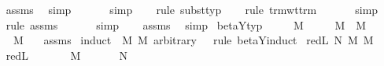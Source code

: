 \begin{isabellebody}
\ \ \isamarkupfalse%
\ assms\ \isamarkupfalse%
\ simp\isanewline
\ \ \isamarkupfalse%
\ {}\ \isamarkupfalse%
\ simp\isanewline
\ \ \isamarkupfalse%
\ {\isacharparenleft}rule\ subst{\isacharunderscore}typ{\isacharparenright}\isanewline
\ \ \isamarkupfalse%
\ {\isacharparenleft}rule\ trm{\isacharunderscore}wt{\isacharunderscore}trm{\isacharparenright}\isanewline
\ \ \isamarkupfalse%
\ {}\ \isamarkupfalse%
\ simp\isanewline
\ \ \isamarkupfalse%
\ {\isacharparenleft}rule\ assms{\isacharparenleft}{}{\isacharparenright}{\isacharparenright}\isanewline
\ \ \isamarkupfalse%
\ {}\ \isamarkupfalse%
\ simp\isanewline
\ \ \isamarkupfalse%
\ assms\ \isamarkupfalse%
\ simp\isanewline
{}\isamarkupfalse%
%
\endisatagproof
{\isafoldproof}%
%
\isadelimproof
\isanewline
%
\endisadelimproof
\isanewline
{}\isamarkupfalse%
\ beta{\isacharunderscore}Y{\isacharunderscore}typ{\isacharcolon}\isanewline
\ \ \ {\isachardoublequoteopen}{\isasymGamma}\ {\isasymturnstile}\ M\ {\isacharcolon}\ {\isasymsigma}{\isachardoublequoteclose}\isanewline
\ \ \ {\isachardoublequoteopen}M\ {\isasymRightarrow}\ M{\isacharprime}{\isachardoublequoteclose}\isanewline
\ \ \ {\isachardoublequoteopen}{\isasymGamma}\ {\isasymturnstile}\ M{\isacharprime}\ {\isacharcolon}\ {\isasymsigma}{\isachardoublequoteclose}\isanewline
%
\isadelimproof
%
\endisadelimproof
%
\isatagproof
{}\isamarkupfalse%
\ assms{\isacharparenleft}{}{\isacharcomma}{}{\isacharparenright}\isanewline
{}\isamarkupfalse%
\ {\isacharparenleft}induct\ \ M\ M{\isacharprime}\ arbitrary{\isacharcolon}\ {\isasymGamma}\ {\isasymsigma}\ rule{\isacharcolon}\ beta{\isacharunderscore}Y{\isachardot}induct{\isacharparenright}\isanewline
{}\isamarkupfalse%
\ {\isacharparenleft}red{\isacharunderscore}L\ N\ M\ M{\isacharprime}{\isacharparenright}\isanewline
\ \ \isamarkupfalse%
\ red{\isacharunderscore}L{\isacharparenleft}{}{\isacharparenright}\ \isamarkupfalse%
\ {\isasymtau}\ \ {}{\isacharcolon}\ {\isachardoublequoteopen}{\isasymGamma}\ {\isasymturnstile}\ M\ {\isacharcolon}\ {\isasymtau}\ {\isasymrightarrow}\ {\isasymsigma}{\isachardoublequoteclose}\ {\isachardoublequoteopen}{\isasymGamma}\ {\isasymturnstile}\ N\ {\isacharcolon}\ {\isasymtau}{\isachardoublequoteclose}\isanewline

\end{isabellebody}
